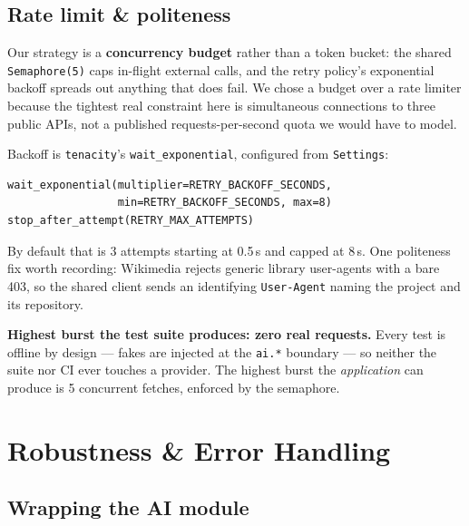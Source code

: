 \documentclass[11pt,a4paper]{article}
\begin{document}
\subsection{Rate limit \& politeness}

Our strategy is a \textbf{concurrency budget} rather than a token bucket: the shared
\texttt{Semaphore(5)} caps in-flight external calls, and the retry policy's exponential backoff
spreads out anything that does fail. We chose a budget over a rate limiter because the tightest real
constraint here is simultaneous connections to three public APIs, not a published requests-per-second
quota we would have to model.

Backoff is \texttt{tenacity}'s \texttt{wait\_exponential}, configured from \texttt{Settings}:

\begin{lstlisting}[style=python, numbers=none]
wait_exponential(multiplier=RETRY_BACKOFF_SECONDS,
                 min=RETRY_BACKOFF_SECONDS, max=8)
stop_after_attempt(RETRY_MAX_ATTEMPTS)
\end{lstlisting}

\noindent By default that is 3 attempts starting at 0.5\,s and capped at 8\,s. One politeness fix worth recording: Wikimedia rejects generic library
user-agents with a bare 403, so the shared client sends an identifying \texttt{User-Agent} naming
the project and its repository.

\textbf{Highest burst the test suite produces: zero real requests.} Every test is offline by design
--- fakes are injected at the \texttt{ai.*} boundary --- so neither the suite nor CI ever touches a
provider. The highest burst the \emph{application} can produce is 5 concurrent fetches, enforced by
the semaphore.

\section{Robustness \& Error Handling}\label{sec:robustness}

\subsection{Wrapping the AI module}
\end{document}

